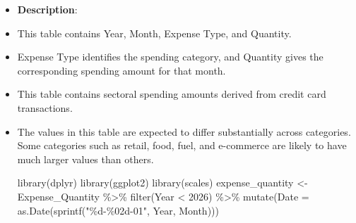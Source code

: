 \documentclass[
  11pt,
  a4paper,
]{article}
\newenvironment{Shaded}{\begin{snugshade}}{\end{snugshade}}
\newcommand{\AttributeTok}[1]{\textcolor[rgb]{0.40,0.45,0.13}{#1}}
\newcommand{\DecValTok}[1]{\textcolor[rgb]{0.68,0.00,0.00}{#1}}
\newcommand{\FunctionTok}[1]{\textcolor[rgb]{0.28,0.35,0.67}{#1}}
\newcommand{\NormalTok}[1]{\textcolor[rgb]{0.00,0.23,0.31}{#1}}
\newcommand{\OtherTok}[1]{\textcolor[rgb]{0.00,0.23,0.31}{#1}}
\newcommand{\SpecialCharTok}[1]{\textcolor[rgb]{0.37,0.37,0.37}{#1}}
\newcommand{\StringTok}[1]{\textcolor[rgb]{0.13,0.47,0.30}{#1}}
\begin{document}
\begin{itemize}
\item
  \textbf{Description}:
\item
  This table contains Year, Month, Expense Type, and Quantity.\\
\item
  Expense Type identifies the spending category, and Quantity gives the
  corresponding spending amount for that month.
\item
  This table contains sectoral spending amounts derived from credit card
  transactions.
\item
  The values in this table are expected to differ substantially across
  categories. Some categories such as retail, food, fuel, and e-commerce
  are likely to have much larger values than others.

\begin{Shaded}
\begin{Highlighting}[]
\FunctionTok{library}\NormalTok{(dplyr)}
\FunctionTok{library}\NormalTok{(ggplot2)}
\FunctionTok{library}\NormalTok{(scales)}
\NormalTok{expense\_quantity }\OtherTok{\textless{}{-}}\NormalTok{ Expense\_Quantity }\SpecialCharTok{\%\textgreater{}\%}
  \FunctionTok{filter}\NormalTok{(Year }\SpecialCharTok{\textless{}} \DecValTok{2026}\NormalTok{) }\SpecialCharTok{\%\textgreater{}\%}
  \FunctionTok{mutate}\NormalTok{(}\AttributeTok{Date =} \FunctionTok{as.Date}\NormalTok{(}\FunctionTok{sprintf}\NormalTok{(}\StringTok{"\%d{-}\%02d{-}01"}\NormalTok{, Year, Month)))}


\end{Highlighting}
\end{Shaded}
\end{itemize}
\end{document}
